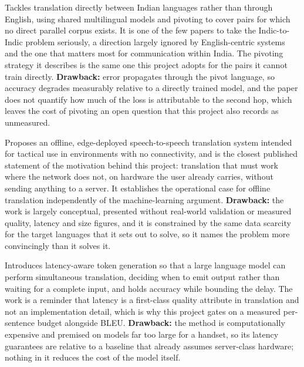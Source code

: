 Tackles translation directly between Indian languages rather than
through English, using shared multilingual models and pivoting to cover pairs
for which no direct parallel corpus exists. It is one of the few papers to take
the Indic-to-Indic problem seriously, a direction largely ignored by
English-centric systems and the one that matters most for communication within
India. The pivoting strategy it describes is the same one this project adopts
for the pairs it cannot train directly. \textbf{Drawback:} error propagates
through the pivot language, so accuracy degrades measurably relative to a
directly trained model, and the paper does not quantify how much of the loss is
attributable to the second hop, which leaves the cost of pivoting an open
question that this project also records as unmeasured.

Proposes an offline, edge-deployed speech-to-speech translation system
intended for tactical use in environments with no connectivity, and is the
closest published statement of the motivation behind this project: translation
that must work where the network does not, on hardware the user already
carries, without sending anything to a server. It establishes the operational
case for offline translation independently of the machine-learning argument.
\textbf{Drawback:} the work is largely conceptual, presented without real-world
validation or measured quality, latency and size figures, and it is constrained
by the same data scarcity for the target languages that it sets out to solve,
so it names the problem more convincingly than it solves it.

Introduces latency-aware token generation so that a large language model
can perform simultaneous translation, deciding when to emit output rather than
waiting for a complete input, and holds accuracy while bounding the delay. The
work is a reminder that latency is a first-class quality attribute in
translation and not an implementation detail, which is why this project gates
on a measured per-sentence budget alongside BLEU.
\textbf{Drawback:} the method is computationally expensive and premised on
models far too large for a handset, so its latency guarantees are relative to a
baseline that already assumes server-class hardware; nothing in it reduces the
cost of the model itself.

